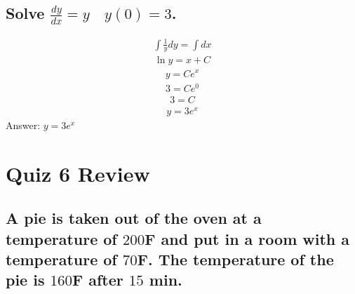 \documentclass{article}
\begin{document}
\subsection{Solve $\frac{dy}{dx} = y \quad y(0) = 3$.}
\begin{align*}
	\int {\frac{1}{y}} dy = \int dx
\end{align*}
\begin{align*}
	\ln{y} = x + C
\end{align*}
\begin{align*}
	y = Ce^x
\end{align*}
\begin{align*}
	3 = Ce^0
\end{align*}
\begin{align*}
	3 = C
\end{align*}
\begin{align*}
	y = 3e^x
\end{align*}
Answer: $y = 3e^x$






\newpage
\section{Quiz 6 Review}

\subsection{A pie is taken out of the oven at a temperature of $200$F and put in a room with a temperature of $70$F. The temperature of the pie is $160$F after $15$ min.}
\end{document}
